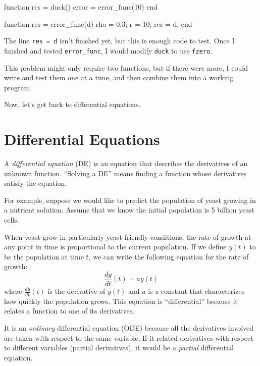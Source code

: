 \begin{code}
function res = duck()
    error = error_func(10)
end

function res = error_func(d)
    rho = 0.3;      %
    r = 10;         %
    res = d;
end
\end{code}

The line {\tt res = d} isn't finished yet, but this
is enough code to test.
Once I finished and tested \verb"error_func", I would modify
{\tt duck} to use {\tt fzero}.

This problem might only require two functions, but if there
were more, I could write and test them one at a time, and then
combine them into a working program.

Now, let's get back to differential equations.


\section{Differential Equations}
\label{diffeq}

A {\em differential equation} (DE) is an equation that describes the
derivatives of an unknown function.  ``Solving a DE'' means finding a
function whose derivatives satisfy the equation.


For example, suppose we would like to predict the population of yeast growing in a nutrient solution.  Assume that we know the initial population is 5 billion yeast cells.

When yeast grow in particularly yeast-friendly
conditions, the rate of growth at any point in time is proportional to the current population.  If we define $y(t)$ to be the population at  time $t$, we can write the following equation for the rate of growth:
%
\begin{equation}
\frac{dy}{dt}(t) = a y(t)
\end{equation}
%
where $\frac{dy}{dt}(t)$ is the derivative of $y(t)$ and
$a$ is a constant that characterizes how quickly the population
grows.
This equation is ``differential'' because it relates a function to one of its derivatives.


It is an {\em ordinary} differential equation (ODE) because all the
derivatives involved are taken with respect to the
same variable.
If it related derivatives with respect to
different variables (partial derivatives), it would be a {\em partial}
differential equation.


